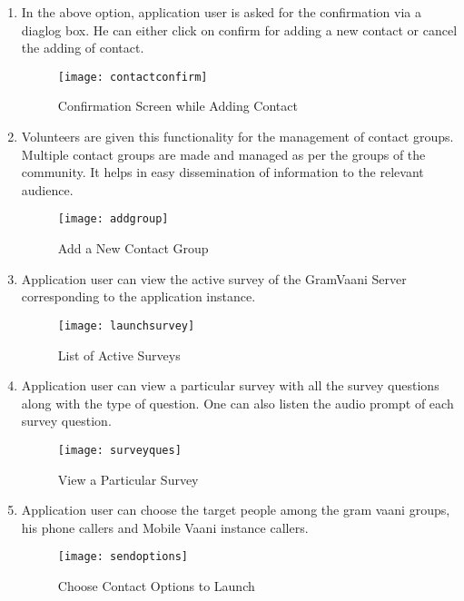 \begin {enumerate}
\item In the above option, application user is asked for the confirmation via a diaglog box. He can either click on confirm for adding a new contact or cancel the adding of contact.
\begin{figure}[H]
\begin{center}   
\texttt{[image: contactconfirm]}
\caption{Confirmation Screen while Adding Contact}
\label{fig:contact2}
\end{center}
\end{figure}
 
\item  Volunteers are given this functionality for the management of contact groups. Multiple contact groups are made and managed as per the groups of the community. It helps in easy dissemination of information to the relevant audience.
\begin{figure}[H]
\begin{center}   
\texttt{[image: addgroup]}
\caption{Add a New Contact Group}
\label{fig:group1}
\end{center}
\end{figure}

\item Application user can view the active survey of the GramVaani Server corresponding to the application instance.
\begin{figure}[H]
\begin{center}   
\texttt{[image: launchsurvey]}
\caption{List of Active Surveys}
\label{fig:viewlaunchsurvey}
\end{center}
\end{figure}

\item Application user can view a particular survey with all the survey questions along with the type of question. One can also listen the audio prompt of each survey question.
\begin{figure}[H]
\begin{center}   
\texttt{[image: surveyques]}
\caption{View a Particular Survey}
\label{fig:viewsurvey}
\end{center}
\end{figure}

\item  Application user can choose the target people among the gram vaani groups, his phone callers and  Mobile Vaani instance callers.
\begin{figure}[H]
\begin{center}   
\texttt{[image: sendoptions]}
\caption{Choose Contact Options to Launch}
\label{fig:contactoptions}
\end{center}
\end{figure}


\end{enumerate}
